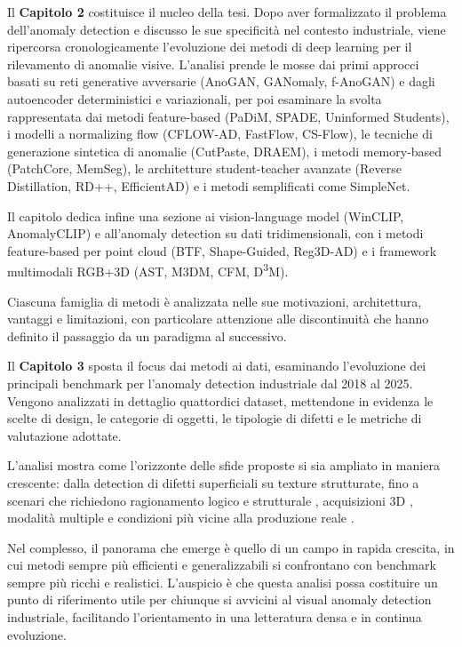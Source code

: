\medskip
\noindent Il \textbf{Capitolo 2} costituisce il nucleo della tesi. Dopo aver formalizzato il problema dell'anomaly detection e discusso le sue specificità nel contesto industriale, viene ripercorsa cronologicamente l'evoluzione dei metodi di deep learning per il rilevamento di anomalie visive. L'analisi prende le mosse dai primi approcci basati su reti generative avversarie (AnoGAN, GANomaly, f-AnoGAN) e dagli autoencoder deterministici e variazionali, per poi esaminare la svolta rappresentata dai metodi feature-based (PaDiM, SPADE, Uninformed Students), i modelli a normalizing flow (CFLOW-AD, FastFlow, CS-Flow), le tecniche di generazione sintetica di anomalie (CutPaste, DRAEM), i metodi memory-based (PatchCore, MemSeg), le architetture student-teacher avanzate (Reverse Distillation, RD++, EfficientAD) e i metodi semplificati come SimpleNet. 

Il capitolo dedica infine una sezione ai vision-language model (WinCLIP, AnomalyCLIP) e all'anomaly detection su dati tridimensionali, con i metodi feature-based per point cloud (BTF, Shape-Guided, Reg3D-AD) e i framework multimodali RGB+3D (AST, M3DM, CFM, D\textsuperscript{3}M). 

Ciascuna famiglia di metodi è analizzata nelle sue motivazioni, architettura, vantaggi e limitazioni, con particolare attenzione alle discontinuità che hanno definito il passaggio da un paradigma al successivo.

\medskip
\noindent Il \textbf{Capitolo 3} sposta il focus dai metodi ai dati, esaminando l'evoluzione dei principali benchmark per l'anomaly detection industriale dal 2018 al 2025. Vengono analizzati in dettaglio quattordici dataset, mettendone in evidenza le scelte di design, le categorie di oggetti, le tipologie di difetti e le metriche di valutazione adottate. 

L'analisi mostra come l'orizzonte delle sfide proposte si sia ampliato in maniera crescente: dalla detection di difetti superficiali su texture strutturate, fino a scenari che richiedono ragionamento logico e strutturale \cite{bergmann2022beyond}, acquisizioni 3D \cite{bergmann2021mvtec3d}, modalità multiple \cite{zhu2025realiadd3, sim3d2025} e condizioni più vicine alla produzione reale \cite{wang2024realiad, bergmann2025mvtecad2}.

\medskip
Nel complesso, il panorama che emerge è quello di un campo in rapida crescita, in cui metodi sempre più efficienti e generalizzabili si confrontano con benchmark sempre più ricchi e realistici. L'auspicio è che questa analisi possa costituire un punto di riferimento utile per chiunque si avvicini al visual anomaly detection industriale, facilitando l'orientamento in una letteratura densa e in continua evoluzione.
